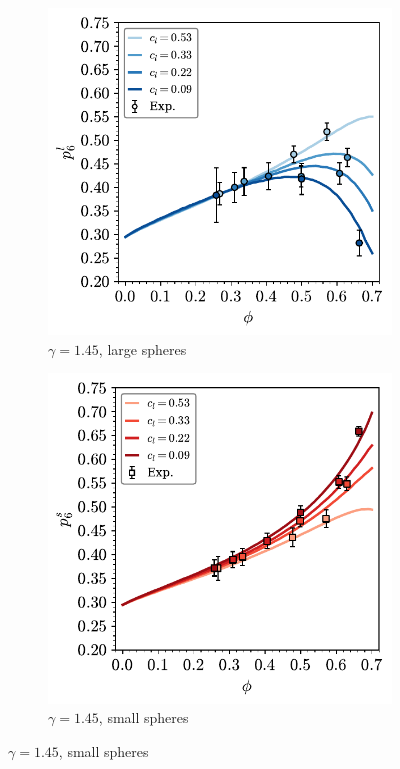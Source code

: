 \begin{figure}[bt]
      \begin{subfigure}[b]{0.48\textwidth}
         \centering
         \includegraphics[width=\textwidth]{./figures/quasi2d/bi_ssr_l_phi_p6.pdf}
         \caption{$\gamma=1.45$, large spheres}
         \label{fig:bi3}
     \end{subfigure}
     \hfill
     \begin{subfigure}[b]{0.48\textwidth}
         \centering
         \includegraphics[width=\textwidth]{./figures/quasi2d/bi_ssr_s_phi_p6.pdf}
         \caption{$\gamma=1.45$, small spheres}
         \label{fig:bi4}
     \end{subfigure}
     \hfill
    

\end{figure}
